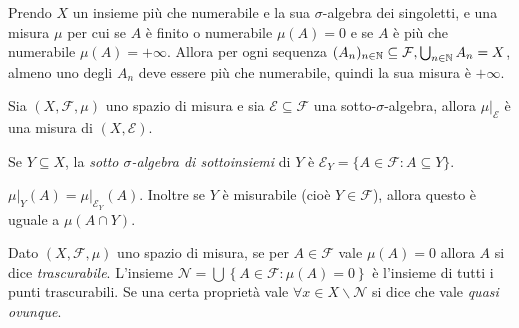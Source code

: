 \begin{example} 
	Prendo $X$ un insieme più che numerabile e la sua $\sigma$-algebra dei singoletti, e una misura $\mu$ per cui se $A$ è finito o numerabile $\mu(A)=0$ e se $A$ è più che numerabile $\mu(A)=+\infty$. Allora per ogni sequenza $(A_n)_{n\in\mathbb{N}}\subseteq\mathcal{F}, \bigcup_{n\in\mathbb{N}} A_n=X$, almeno uno degli $A_n$ deve essere più che numerabile, quindi la sua misura è $+\infty$.
\end{example}
\begin{prop}
	Sia $(X,\mathcal{F}, \mu)$ uno spazio di misura e sia $\mathcal{E} \subseteq \mathcal{F}$ una sotto-$\sigma$-algebra, allora $\mu\lvert_{\mathcal{E}}$ è una misura di $(X,\mathcal{E})$.
\end{prop}
\begin{definition}
	Se $Y\subseteq X$, la \emph{sotto $\sigma$-algebra di sottoinsiemi} di $Y$ è $\mathcal{E}_Y=\{A\in \mathcal{F} : A \subseteq Y\}$.
\end{definition}
\begin{exercise}
	$\mu\lvert_{Y}(A)=\mu\lvert_{\mathcal{E}_Y}(A)$. Inoltre se $Y$ è misurabile (cioè $Y\in \mathcal{F}$), allora questo è uguale a $\mu(A\cap Y)$.
\end{exercise}
\begin{definition}
	Dato $(X,\mathcal{F}, \mu)$ uno spazio di misura, se per $A\in \mathcal{F}$ vale $\mu(A)=0$ allora $A$ si dice \emph{trascurabile}. L'insieme $\mathscr{N}=\bigcup \left\{A\in \mathcal{F} : \mu(A)=0 \right\}$ è l'insieme di tutti i punti trascurabili. Se una certa proprietà vale $\forall x \in X\backslash \mathscr{N}$ si dice che vale \emph{quasi ovunque}. 
\end{definition}

